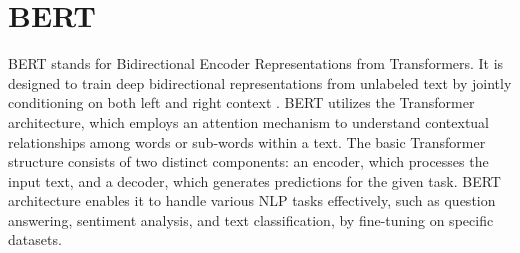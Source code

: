\section{BERT}
    BERT stands for Bidirectional Encoder Representations from Transformers. It is designed to train deep bidirectional representations from unlabeled text by jointly conditioning on both left and right context \cite{devlin2019bert}. BERT utilizes the Transformer architecture, which employs an attention mechanism to understand contextual relationships among words or sub-words within a text. The basic Transformer structure consists of two distinct components: an encoder, which processes the input text, and a decoder, which generates predictions for the given task. BERT architecture enables it to handle various NLP tasks effectively, such as question answering, sentiment analysis, and text classification, by fine-tuning on specific datasets. 

    \begin{figure}[hbt!]
    \end{figure}
